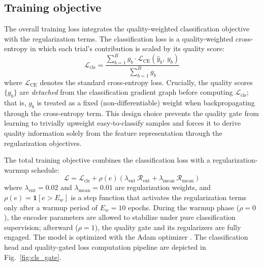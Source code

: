 \documentclass[preprint,12pt,authoryear]{elsarticle}
\begin{document}
\subsection{Training objective}
\label{sec:loss}

The overall training loss integrates the quality-weighted classification objective with the regularization terms. The classification loss is a quality-weighted cross-entropy in which each trial's contribution is scaled by its quality score:
\begin{equation}
\label{eq:weighted_ce}
\mathcal{L}_{\mathrm{cls}} = \frac{\displaystyle\sum_{b=1}^{B} g_b \cdot \mathcal{L}_{\mathrm{CE}}(\hat{y}_b,\, y_b)}{\displaystyle\sum_{b=1}^{B} g_b}
\end{equation}
where $\mathcal{L}_{\mathrm{CE}}$ denotes the standard cross-entropy loss. Crucially, the quality scores $\{g_b\}$ are \textit{detached} from the classification gradient graph before computing $\mathcal{L}_{\mathrm{cls}}$; that is, $g_b$ is treated as a fixed (non-differentiable) weight when backpropagating through the cross-entropy term. This design choice prevents the quality gate from learning to trivially upweight easy-to-classify samples and forces it to derive quality information solely from the feature representation through the regularization objectives.

The total training objective combines the classification loss with a regularization-warmup schedule:
\begin{equation}
\label{eq:total_loss}
\mathcal{L} = \mathcal{L}_{\mathrm{cls}} + \rho(e)\!\left(\lambda_{\mathrm{ent}}\,\mathcal{R}_{\mathrm{ent}} + \lambda_{\mathrm{mean}}\,\mathcal{R}_{\mathrm{mean}}\right)
\end{equation}
where $\lambda_{\mathrm{ent}} = 0.02$ and $\lambda_{\mathrm{mean}} = 0.01$ are regularization weights, and $\rho(e) = \mathbf{1}[e > E_w]$ is a step function that activates the regularization terms only after a warmup period of $E_w = 10$ epochs. During the warmup phase ($\rho = 0$), the encoder parameters are allowed to stabilize under pure classification supervision; afterward ($\rho = 1$), the quality gate and its regularizers are fully engaged. The model is optimized with the Adam optimizer \citep{kingma2014adam}. The classification head and quality-gated loss computation pipeline are depicted in Fig.~\ref{fig:cls_gate}.
\end{document}
